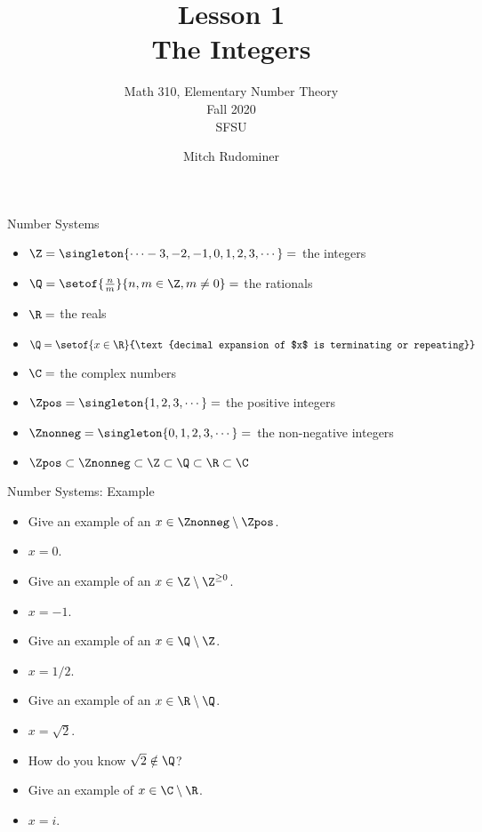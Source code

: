 \documentclass[handout]{beamer}
\title{Lesson 1 \\ The Integers}
\subtitle{Math 310, Elementary Number Theory \\ Fall 2020 \\ SFSU}
\author{Mitch Rudominer}
\date{}
\begin{document}
\begin{frame}
  \titlepage
\end{frame}


\begin{frame}{Number Systems}

  \begin{itemize}
  \item $\Z = \singleton{\cdots -3,-2,-1,0,1,2,3,\cdots} = $ the integers
  \item $\Q = \setof{\frac{n}{m}}{n,m\in \Z, m\not= 0} = $ the rationals
  \item $\R = $ the reals
  \item $\Q = \setof{x\in\R}{\text{decimal expansion of $x$ is terminating or repeating}}$
  \item $\C = $ the complex numbers
  \item $\Zpos = \singleton{1,2,3,\cdots} =$ the positive integers
  \item $\Znonneg = \singleton{0,1,2,3,\cdots} =$ the non-negative integers
  \item  $\Zpos \subset \Znonneg \subset \Z \subset \Q \subset \R \subset \C$
  \end{itemize}


\end{frame}

\begin{frame}{Number Systems: Example}
\begin{itemize}
  \item  Give an example of an $x\in \Znonneg \setminus \Zpos$.
  \item $x=0$.
  \item  Give an example of an $x\in \Z \setminus \Z^{\geq 0}$.
  \item $x=-1$.
  \item  Give an example of an $x\in \Q \setminus \Z$.
  \item $x=1/2$.
  \item  Give an example of an $x\in \R \setminus \Q$.
  \item $x=\sqrt{2}$.
  \item How do you know $\sqrt{2}\notin \Q$?
  \item Give an example of $x\in\C \setminus \R$.
  \item $x=i$.
  \end{itemize}
\end{frame}
\end{document}
